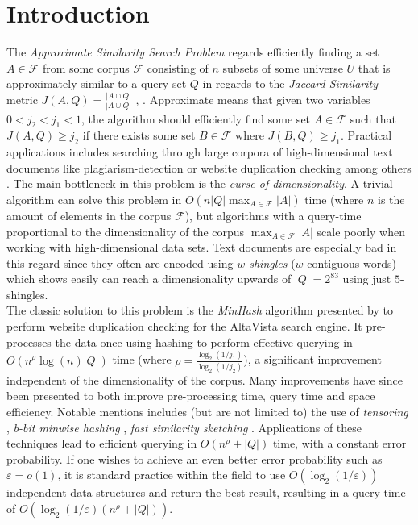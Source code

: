 \section{Introduction}
The \textit{Approximate Similarity Search Problem} regards efficiently finding a set $A\in \mathcal{F}$ from some corpus $\mathcal{F}$ consisting of $n$ subsets of some universe $U$ that is approximately similar to a query set $Q$ in regards to the \textit{Jaccard Similarity} metric $J(A,Q) = \frac{|A\cap Q|}{|A\cup Q|}$ \cite{dahlgaard2017fast}, \cite{fast-similarity-search}. Approximate means that given two variables $0 < j_2 < j_1 < 1$, the algorithm should efficiently find some set $A\in \mathcal{F}$ such that $J(A, Q) \geq j_2$ if there exists some set $B\in \mathcal{F}$ where $J(B,Q)\geq j_1$.
Practical applications includes searching through large corpora of high-dimensional text documents like plagiarism-detection or website duplication checking among others \cite{vassilvitskii2018}. The main bottleneck in this problem is the \textit{curse of dimensionality}. 
A trivial algorithm can solve this problem in $O(n|Q|\max_{A\in \mathcal{F}}{|A|})$ time (where $n$ is the amount of elements in the corpus $\mathcal{F}$), but algorithms with a query-time proportional to the dimensionality of the corpus $\max_{A\in \mathcal{F}}|A|$ scale poorly when working with high-dimensional data sets. 
Text documents are especially bad in this regard since they often are encoded using \textit{$w$-shingles} ($w$ contiguous words) which \citet{li2011hashing} shows easily can reach a dimensionality upwards of $|Q|=2^{83}$ using just $5$-shingles.\\
The classic solution to this problem is the \textit{MinHash} algorithm presented by \citet{broder1997minhash} to perform website duplication checking for the AltaVista search engine. 
It pre-processes the data once using hashing to perform effective querying in $O(n^\rho\log(n)|Q|)$ time (where $\rho = \frac{\log_2{(1/j_1)}}{\log_2{(1/j_2)}}$), a significant improvement independent of the dimensionality of the corpus.
Many improvements have since been presented to both improve pre-processing time, query time and space efficiency. 
Notable mentions includes (but are not limited to) the use of \textit{tensoring} \cite{andoni2006efficient}, \textit{b-bit minwise hashing} \cite{ping2011theory}, \textit{fast similarity sketching} \cite{dahlgaard2017fast}. 
Applications of these techniques lead to efficient querying in $O(n^\rho + |Q|)$ time, with a constant error probability. If one wishes to achieve an even better error probability such as $\varepsilon = o(1)$, it is standard practice within the field to use $O(\log_2(1/\varepsilon))$ independent data structures and return the best result, resulting in a query time of $O(\log_2(1/\varepsilon) (n^\rho + |Q|))$. 

